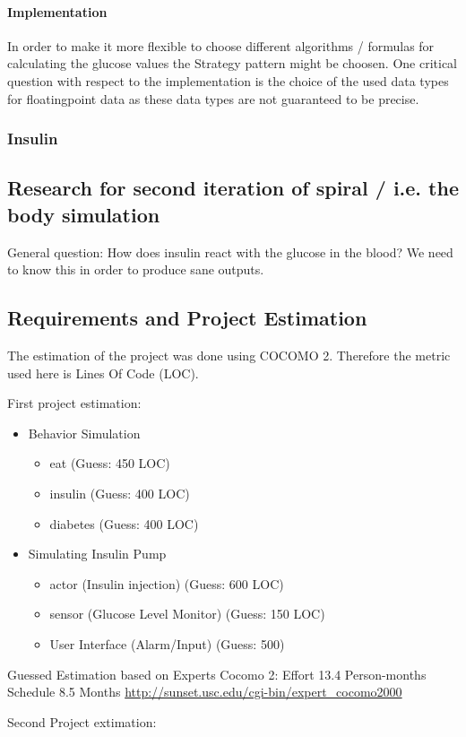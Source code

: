 \paragraph{Implementation}
In order to make it more flexible to choose different algorithms / formulas for
calculating the glucose values the Strategy pattern might be choosen. One
critical question with respect to the implementation is the choice of the used
data types for floatingpoint data as these data types are not guaranteed to be precise.

\subsubsection{Insulin}

\subsection{Research for second iteration of spiral / i.e. the body simulation}
General question:
How does insulin react with the glucose in the blood?
We need to know this in order to produce sane outputs.

\subsection{Requirements and Project Estimation}
The estimation of the project was done using COCOMO 2.
Therefore the metric used here is Lines Of Code (LOC).

First project estimation:
\begin{itemize}
  \item Behavior Simulation
  	\begin{itemize}
        \item eat (Guess: 450 LOC)
        \item insulin (Guess: 400 LOC)
        \item diabetes (Guess: 400 LOC)
    \end{itemize}
  \item Simulating Insulin Pump
  	\begin{itemize}
        \item actor (Insulin injection) (Guess: 600 LOC)
        \item sensor (Glucose Level Monitor) (Guess: 150 LOC)
        \item User Interface (Alarm/Input) (Guess: 500)
    \end{itemize}
\end{itemize} 
Guessed Estimation based on Experts Cocomo 2:
Effort 13.4 Person-months
Schedule 8.5 Months
\url{http://sunset.usc.edu/cgi-bin/expert_cocomo2000}

Second Project extimation:


